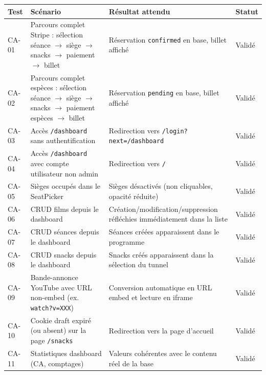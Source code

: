 \documentclass[12pt,a4paper,openany]{report}
\begin{document}
\begin{longtable}{p{1.1cm}p{6.8cm}p{2.8cm}p{1.5cm}}
  \toprule
  \textbf{Test} & \textbf{Scénario} & \textbf{Résultat attendu} & \textbf{Statut} \\
  \midrule
  \endhead
  \bottomrule
  \endfoot

  CA-01 & Parcours complet Stripe : sélection séance $\to$ siège $\to$ snacks $\to$ paiement $\to$ billet & Réservation \texttt{confirmed} en base, billet affiché & Validé \\[4pt]

  CA-02 & Parcours complet espèces : sélection séance $\to$ siège $\to$ snacks $\to$ paiement espèces $\to$ billet & Réservation \texttt{pending} en base, billet affiché & Validé \\[4pt]

  CA-03 & Accès \texttt{/dashboard} sans authentification & Redirection vers \texttt{/login?next=/dashboard} & Validé \\[4pt]

  CA-04 & Accès \texttt{/dashboard} avec compte utilisateur non admin & Redirection vers \texttt{/} & Validé \\[4pt]

  CA-05 & Sièges occupés dans le SeatPicker & Sièges désactivés (non cliquables, opacité réduite) & Validé \\[4pt]

  CA-06 & CRUD films depuis le dashboard & Création/modification/suppression réfléchies immédiatement dans la liste & Validé \\[4pt]

  CA-07 & CRUD séances depuis le dashboard & Séances créées apparaissent dans le programme & Validé \\[4pt]

  CA-08 & CRUD snacks depuis le dashboard & Snacks créés apparaissent dans la sélection du tunnel & Validé \\[4pt]

  CA-09 & Bande-annonce YouTube avec URL non-embed (ex. \texttt{watch?v=XXX}) & Conversion automatique en URL embed et lecture en iframe & Validé \\[4pt]

  CA-10 & Cookie draft expiré (ou absent) sur la page \texttt{/snacks} & Redirection vers la page d'accueil & Validé \\[4pt]

  CA-11 & Statistiques dashboard (CA, comptages) & Valeurs cohérentes avec le contenu réel de la base & Validé \\[4pt]


\end{longtable}
\end{document}
